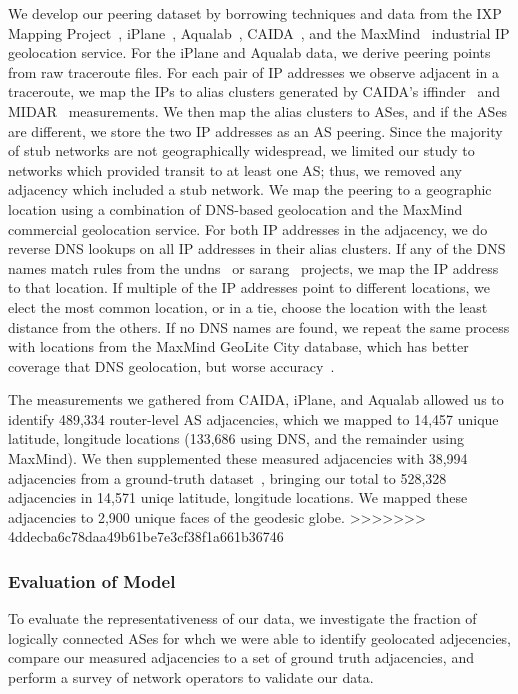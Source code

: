 {We develop our peering dataset by borrowing techniques and data from the IXP
Mapping Project~\cite{ixps-mapped}, iPlane~\cite{iplane},
Aqualab~\cite{sidewalk}, CAIDA~\cite{caidadata}, and the MaxMind~\cite{maxmind}
industrial IP geolocation service.  For the iPlane and Aqualab data, we derive
peering points from raw traceroute files.  For each pair of IP addresses we
observe adjacent in a traceroute, we map the IPs to alias clusters generated by
CAIDA's iffinder~\cite{iffinder} and MIDAR~\cite{iffinder, midar} measurements.
We then map the alias clusters to ASes, and if the ASes are different, we store
the two IP addresses as an AS peering.  Since the majority of stub networks are
not geographically widespread, we limited our study to networks which provided
transit to at least one AS; thus, we removed any adjacency which included a
stub network.  We map the peering to a geographic location using a combination
of DNS-based geolocation and the MaxMind commercial geolocation service.  For
both IP addresses in the adjacency, we do reverse DNS lookups on all IP
addresses in their alias clusters.  If any of the DNS names match rules from
the undns~\cite{undns} or sarang~\cite{sarang} projects, we map the IP address
to that location.  If multiple of the IP addresses point to different
locations, we elect the most common location, or in a tie, choose the location
with the least distance from the others.  If no DNS names are found, we repeat
the same process with locations from the MaxMind GeoLite City database, which
has better coverage that DNS geolocation, but worse
accuracy~\cite{uhlig_ccr_paper}. 

The measurements we gathered from CAIDA, iPlane, and Aqualab allowed us to
identify 489,334 router-level AS adjacencies, which we mapped to 14,457 unique
latitude, longitude locations (133,686 using DNS, and the remainder using
MaxMind).  We then supplemented these measured adjacencies with 38,994
adjacencies from a ground-truth dataset~\cite{ixps-mapped}, bringing our total
to 528,328 adjacencies in 14,571 uniqe latitude, longitude locations.  We
mapped these adjacencies to 2,900 unique faces of the geodesic globe.   
>>>>>>> 4ddecba6c78daa49b61be7e3cf38f1a661b36746

 
\subsubsection*{Evaluation of Model}

    To evaluate the representativeness of our data, we investigate the fraction
    of logically connected ASes for whch we were able to identify geolocated
    adjecencies, compare our measured adjacencies to a set of ground truth
    adjacencies, and perform a survey of network operators to validate our
    data.

}

